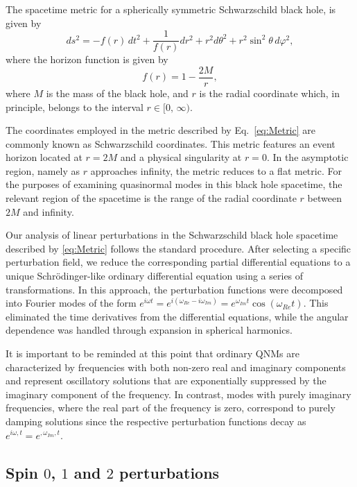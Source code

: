 The spacetime metric for a spherically symmetric Schwarzschild black hole, is given by \cite{Schwarzschild:1916uq}
%
\begin{equation}\label{eq:Metric}
  ds^2=-f(r)\,dt^2+\frac{1}{f(r)}dr^2+r^2d\theta^2+
  r^2\sin^2{\theta}\,d\varphi^2,
\end{equation}
%
where the horizon function is given by
%
\begin{equation}\label{EqHoriFuncHayward}
  f(r)=1-\frac{2M}{r},
\end{equation}
%
where $M$ is the mass of the black hole, and $r$ is the radial coordinate which, in principle, belongs to the interval $r\in [0,\, \infty)$.

The coordinates employed in the metric described by Eq.~\eqref{eq:Metric} are commonly known as Schwarzschild coordinates. This metric features an event horizon located at $r=2M$ and a physical singularity at $r=0$. In the asymptotic region, namely as $r$ approaches infinity, the metric reduces to a flat metric. For the purposes of examining quasinormal modes in this black hole spacetime, the relevant region of the spacetime is the range of the radial coordinate $r$ between $2M$ and infinity.

Our analysis of linear perturbations in the Schwarzschild black hole spacetime described by \eqref{eq:Metric} follows the standard procedure. After selecting a specific perturbation field, we reduce the corresponding partial differential equations to a unique Schrödinger-like ordinary differential equation using a series of transformations. In this approach, the perturbation functions were decomposed into Fourier modes of the form $e^{i\omega t}=e^{i(\omega_{Re}-i \omega_{Im})}=e^{\omega_{Im} t}\cos{\left(\omega_{Re} t\right)}$. This eliminated the time derivatives from the differential equations, while the angular dependence was handled through expansion in spherical harmonics.

It is important to be reminded at this point that ordinary \acp{QNM} are characterized by frequencies with both non-zero real and imaginary components and represent oscillatory solutions that are exponentially suppressed by the imaginary component of the frequency. In contrast, modes with purely imaginary frequencies, where the real part of the frequency is zero, correspond to purely damping solutions since the respective perturbation functions decay as $ e^{i\omega,t}=e^{,\omega_{Im},t}$.

\subsection{Spin $0$, $1$ and $2$ perturbations}

